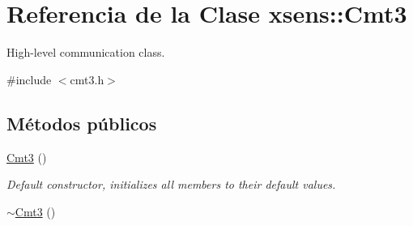 \hypertarget{classxsens_1_1Cmt3}{\section{\-Referencia de la \-Clase xsens\-:\-:\-Cmt3}
\label{classxsens_1_1Cmt3}
}


\-High-\/level communication class.  




{\ttfamily \#include $<$cmt3.\-h$>$}

\subsection*{\-Métodos públicos}
\begin{DoxyCompactItemize}
\item 
\hypertarget{classxsens_1_1Cmt3_a35c7c620a7e71a7c3a07a535763b1665}{\hyperlink{classxsens_1_1Cmt3_a35c7c620a7e71a7c3a07a535763b1665}{\-Cmt3} ()}\label{classxsens_1_1Cmt3_a35c7c620a7e71a7c3a07a535763b1665}

\begin{DoxyCompactList}\small\item\em \-Default constructor, initializes all members to their default values. \end{DoxyCompactList}\item 
\hypertarget{classxsens_1_1Cmt3_a29b5659cf74120f865c8808411eb46af}{\hyperlink{classxsens_1_1Cmt3_a29b5659cf74120f865c8808411eb46af}{$\sim$\-Cmt3} ()}\label{classxsens_1_1Cmt3_a29b5659cf74120f865c8808411eb46af}


\end{DoxyCompactItemize}
